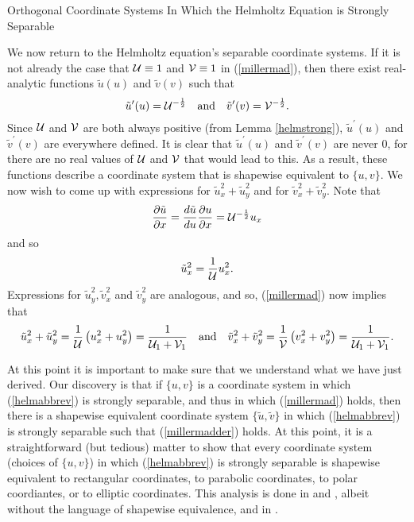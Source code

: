 \begin{section}{Orthogonal Coordinate Systems In Which the Helmholtz Equation is Strongly Separable}
\eex

We now return to the Helmholtz equation's separable coordinate systems.  If it is not already the case that $\mathcal{U} \equiv 1$ and $\mathcal{V} \equiv 1$ in (\ref{millermad}), then there exist real-analytic functions $\tilde{u}(u)$ and $\tilde{v}(v)$ such that
\[
\tilde{u}^\prime(u) = \mathcal{U}^{-\frac{1}{2}}
\quad \mbox{and} \quad
\tilde{v}^\prime(v) = \mathcal{V}^{-\frac{1}{2}}.
\]
Since $\mathcal{U}$ and $\mathcal{V}$ are both always positive (from Lemma \ref{helmstrong}), $\tilde{u}^\prime(u)$ and $\tilde{v}^\prime(v)$ are everywhere defined.  It is clear that $\tilde{u}^\prime(u)$ and $\tilde{v}^\prime(v)$ are never $0$, for there are no real values of $\mathcal{U}$ and $\mathcal{V}$ that would lead to this.  As a result, these functions describe a coordinate system that is shapewise equivalent to $\{ u,v \}$.  We now wish to come up with expressions for $\tilde{u}_x^2 + \tilde{u}_y^2$ and for $\tilde{v}_x^2 + \tilde{v}_y^2$.  Note that
\[
\frac{\partial \tilde{u}}{\partial x} = \frac{d \tilde{u}}{d u} \frac{\partial u}{\partial x} = \mathcal{U}^{-\frac{1}{2}}u_x
\]
and so
\[
\tilde{u}_x^2 = \frac{1}{\mathcal{U}}u_x^2.
\]
Expressions for $\tilde{u}_y^2, \tilde{v}_x^2$ and $\tilde{v}_y^2$ are analogous, and so, (\ref{millermad}) now implies that
\begin{equation}
\label{millermadder}
\tilde{u}_x^2 + \tilde{u}_y^2 = \frac{1}{\mathcal{U}} \left( u_x^2 + u_y^2 \right) = \frac{1}{\mathcal{U}_1 + \mathcal{V}_1}
\quad \mbox{and} \quad
\tilde{v}_x^2 + \tilde{v}_y^2 = \frac{1}{\mathcal{V}} \left( v_x^2 + v_y^2 \right) = \frac{1}{\mathcal{U}_1 + \mathcal{V}_1}.
\end{equation}

At this point it is important to make sure that we understand what we have just derived.  Our discovery is that if $\{ u,v \}$ is a coordinate system in which (\ref{helmabbrev}) is strongly separable, and thus in which (\ref{millermad}) holds, then there is a shapewise equivalent coordinate system $\{ \tilde{u}, \tilde{v} \}$ in which (\ref{helmabbrev}) is strongly separable such that (\ref{millermadder}) holds.  At this point, it is a straightforward (but tedious) matter to show that every coordinate system (choices of $\{ u,v \}$) in which (\ref{helmabbrev}) is strongly separable is shapewise equivalent to rectangular coordinates, to parabolic coordinates, to polar coordiantes, or to elliptic coordinates.  This analysis is done in \cite{miller} and \cite{morse}, albeit without the language of shapewise equivalence, and in \cite{spiegel}.

\end{section}